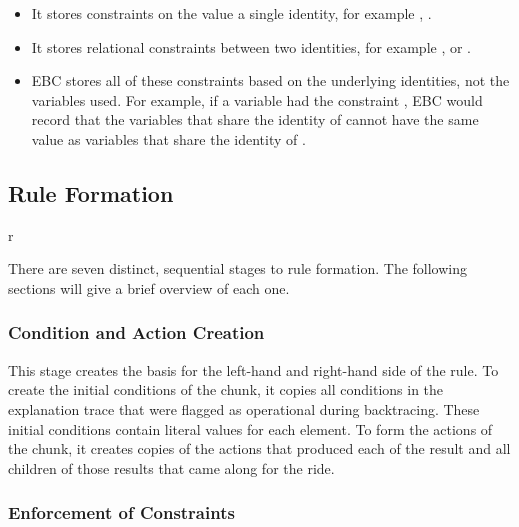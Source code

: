 \begin{itemize}
	\item It stores constraints on the value a single identity, for example , .
	\item It stores relational constraints between two identities, for example ,   or  .  
	\item EBC stores all of these constraints based on the underlying identities, not the variables used.  For example, if a variable  had the constraint , EBC would record that the variables that share the identity of  cannot have the same value as variables that share the identity of .
\end{itemize}

\subsection{Rule Formation}
\label{CHUNKING-during-formation}

\begin{wrapfigure}{r}{\the\thirdwidth}
	\caption{}
	\label{fig:chunking-rule-formation}
\end{wrapfigure}

There are seven distinct, sequential stages to rule formation.  The following sections will give a brief overview of each one.

\FloatBarrier
\subsubsection{Condition and Action Creation}

This stage creates the basis for the left-hand and right-hand side of the rule.  
To create the initial conditions of the chunk, it copies all conditions in the explanation trace that were flagged as operational during backtracing.  These initial conditions contain literal values for each element.
To form the actions of the chunk, it creates copies of the actions that produced each of the result and all children of those results that came along for the ride.

\subsubsection{Enforcement of Constraints}

